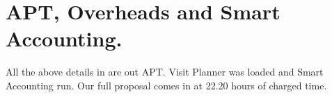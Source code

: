 \section*{APT, Overheads and Smart Accounting.}
All the above details in are out APT. 
Visit Planner was loaded and Smart Accounting run. 
Our full proposal comes in at 22.20 hours of charged time. 




